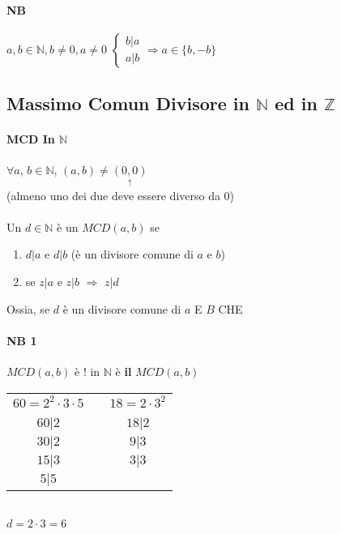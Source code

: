     \paragraph{NB} $a,b \in\mathbb{N}, b\neq 0, a\neq 0$
    $
    \begin{cases}
        b|a\\
        a|b
    \end{cases}
    \Longrightarrow a\in\{b,-b\}$\\

    \subsection{Massimo Comun Divisore in $\mathbb{N}$ ed in $\mathbb{Z}$}
    \paragraph{MCD In $\mathbb{N}$} $\forall a$, $b\in\mathbb{N}$, $(a,b)\neq \underset{\uparrow}
    {(0,0)}$\\
    (almeno uno dei due deve essere diverso da $0$) \\\\
    Un $d\in\mathbb{N}$ è un $MCD(a,b)$ se 
    \begin{enumerate}
        \item $d|a$ e $d|b$ (è un divisore comune di $a$ e $b$)
        \item se $z|a$ e $z|b$ $\Longrightarrow$ $z|d$
    \end{enumerate}
    Ossia, se $d$ è un divisore comune di $a$ E $B$ CHE 
    \color{red}
    \paragraph{NB 1} $MCD(a,b)$ è $!$ in $\mathbb{N}$ \hspace{1cm}è \textbf{il} $MCD(a,b)$
    \color{black}
    \begin{center}
        \begin{tabular}{c c c}
            $60=2^2\cdot 3\cdot 5$ & \hspace{2cm} & $18=2\cdot 3^2$\\
            & & \\
            $60|2$ & \hspace{2cm} & $18|2$ \\
            $30|2$ & \hspace{2cm} & $9|3$ \\
            $15|3$ & \hspace{2cm} & $3|3$ \\
            $5|5$
        \end{tabular}\\
        $d=2\cdot 3= 6$
    \end{center}
